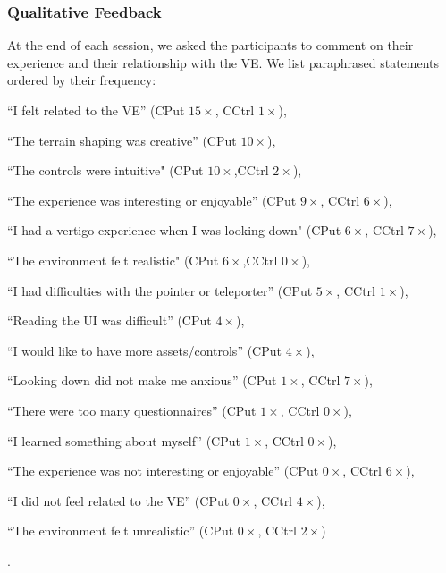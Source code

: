 \subsubsection*{Qualitative Feedback}
At the end of each session, we asked the participants to comment on their experience and their relationship with the \ac{VE}.
We list paraphrased statements ordered by their frequency:
\begin{enumerate*}
    \item[] ``I felt related to the \ac{VE}'' (\acl{CPut} $15{\times}$, \acl{CCtrl} $1{\times}$),
    \item[] ``The terrain shaping was creative'' (\acl{CPut} $10{\times}$),
    \item[] ``The controls were intuitive" (\acl{CPut} $10{\times}$,\acl{CCtrl} $2{\times}$),
    \item[] ``The experience was interesting or enjoyable'' (\acl{CPut} $9{\times}$, \acl{CCtrl} $6{\times}$),
    \item[] ``I had a vertigo experience when I was looking down" (\acl{CPut} $6{\times}$, \acl{CCtrl} $7{\times}$),
    \item[] ``The environment felt realistic" (\acl{CPut} $6{\times}$,\acl{CCtrl} $0{\times}$),
    \item[] ``I had difficulties with the pointer or teleporter'' (\acl{CPut} $5{\times}$, \acl{CCtrl} $1{\times}$),
    \item[] ``Reading the UI was difficult'' (\acl{CPut} $4{\times}$),
    \item[] ``I would like to have more assets/controls'' (\acl{CPut} $4{\times}$),
    \item[] ``Looking down did not make me anxious'' (\acl{CPut} $1{\times}$, \acl{CCtrl} $7{\times}$),
    \item[] ``There were too many questionnaires'' (\acl{CPut} $1{\times}$, \acl{CCtrl} $0{\times}$),
    \item[] ``I learned something about myself'' (\acl{CPut} $1{\times}$, \acl{CCtrl} $0{\times}$),
    \item[] ``The experience was not interesting or enjoyable'' (\acl{CPut} $0{\times}$, \acl{CCtrl} $6{\times}$),
    \item[] ``I did not feel related to the \ac{VE}'' (\acl{CPut} $0{\times}$, \acl{CCtrl} $4{\times}$),
    \item[] ``The environment felt unrealistic'' (\acl{CPut} $0{\times}$, \acl{CCtrl} $2{\times}$)
\end{enumerate*}.


